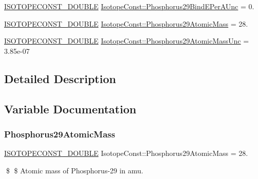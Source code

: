 \begin{DoxyCompactItemize}
\mbox{\hyperlink{group___isotope_const-_macros_ga8f45a7272ce02c0b4c65c44636ed719a}{I\+S\+O\+T\+O\+P\+E\+C\+O\+N\+S\+T\+\_\+\+D\+O\+U\+B\+LE}} \mbox{\hyperlink{group___isotope_const-_phosphorus-_p29_ga1a9f24fabf86013bc7da362105798091}{Isotope\+Const\+::\+Phosphorus29\+Bind\+E\+Per\+A\+Unc}} = 0.
\item 
\mbox{\hyperlink{group___isotope_const-_macros_ga8f45a7272ce02c0b4c65c44636ed719a}{I\+S\+O\+T\+O\+P\+E\+C\+O\+N\+S\+T\+\_\+\+D\+O\+U\+B\+LE}} \mbox{\hyperlink{group___isotope_const-_phosphorus-_p29_ga47f4749a6acf750b00f176d373288d72}{Isotope\+Const\+::\+Phosphorus29\+Atomic\+Mass}} = 28.
\item 
\mbox{\hyperlink{group___isotope_const-_macros_ga8f45a7272ce02c0b4c65c44636ed719a}{I\+S\+O\+T\+O\+P\+E\+C\+O\+N\+S\+T\+\_\+\+D\+O\+U\+B\+LE}} \mbox{\hyperlink{group___isotope_const-_phosphorus-_p29_ga613afa0a1cc6e2fde99496b69ceb4a3d}{Isotope\+Const\+::\+Phosphorus29\+Atomic\+Mass\+Unc}} = 3.\+85e-\/07
\end{DoxyCompactItemize}


\subsection{Detailed Description}


\subsection{Variable Documentation}
\mbox{\label{group___isotope_const-_phosphorus-_p29_ga47f4749a6acf750b00f176d373288d72}} 
\subsubsection{\texorpdfstring{Phosphorus29\+Atomic\+Mass}{Phosphorus29AtomicMass}}
{\footnotesize\ttfamily \mbox{\hyperlink{group___isotope_const-_macros_ga8f45a7272ce02c0b4c65c44636ed719a}{I\+S\+O\+T\+O\+P\+E\+C\+O\+N\+S\+T\+\_\+\+D\+O\+U\+B\+LE}} Isotope\+Const\+::\+Phosphorus29\+Atomic\+Mass = 28.}

\$ \$ Atomic mass of Phosphorus-\/29 in amu. \mbox{\label{group___isotope_const-_phosphorus-_p29_ga613afa0a1cc6e2fde99496b69ceb4a3d}} 
